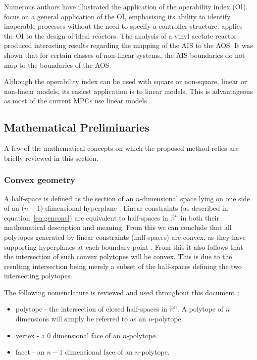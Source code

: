 \documentclass[final,authoryear,5pt,times,twocolumn]{elsarticle}
\newcommand{\npoly}{$n$-polytope}
\begin{document}
Numerous authors have illustrated the application of the operability index (OI). 
\citet{opconproc} focus on a general application of the OI, emphasising its ability to identify inoperable processes without the need to specify a controller structure. 
\citet{opidealrx} applies the OI to the design of ideal reactors. 
The analysis of a vinyl acetate reactor produced interesting results
regarding the mapping of the AIS to the AOS. 
It was shown that for certain classes of non-linear systems, the AIS boundaries do not map to the boundaries of the AOS.

Although the  operability index can be used with square or non-square, linear or non-linear models, its easiest application is to linear models. 
This is advantageous as most of the current MPCs use linear models \citep{vinsonphd}.


\subsection{Mathematical Preliminaries}
A few of the mathematical concepts on which the proposed method relies are briefly reviewed in this section.

\subsubsection{Convex geometry}
A half-space is defined as the section of an $n$-dimensional space lying on one side of an ($n-1$)-dimensional hyperplane \citep[1282]{crcmaths}.
Linear constraints (as described in equation~\ref{eq:gencons}) are equivalent to half-spaces in $\mathbb{R}^n$ in both their mathematical description and meaning.
From this we can conclude that all polytopes generated by linear constraints (half-spaces) are convex, as they have supporting hyperplanes at each boundary point \citep[21]{manilev}.
From this it also follows that the intersection of such convex polytopes will be convex.
This is due to the resulting intersection being merely a subset of the half-spaces defining the two intersecting polytopes.

The following nomenclature is reviewed and used throughout this document \citep[487]{bayerlee};
\begin{itemize}
\item polytope - the intersection of closed half-spaces in $\mathbb{R}^n$.
A polytope of $n$ dimensions will simply be referred to as an $n$-polytope.
\item vertex - a 0 dimensional face of an \npoly.
\item facet - an $n-1$ dimensional face of an \npoly.
\end{itemize}
\end{document}
